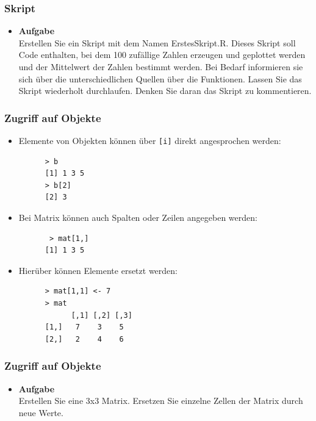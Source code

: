 \documentclass{beamer}
\begin{document}
\begin{frame}[fragile]
  \frametitle{Skript}
  \begin{itemize}
    \item \textbf{Aufgabe} \\ 
      Erstellen Sie ein Skript mit dem Namen ErstesSkript.R. Dieses Skript soll Code enthalten, bei dem 100 zufällige Zahlen erzeugen und geplottet werden und der Mittelwert der Zahlen bestimmt werden. Bei Bedarf informieren sie sich über die unterschiedlichen Quellen über die Funktionen. Lassen Sie das Skript wiederholt durchlaufen. Denken Sie daran das Skript zu kommentieren.
  \end{itemize}
\end{frame}

\begin{frame}[fragile]
  \frametitle{Zugriff auf Objekte}
  \begin{itemize}
    \item Elemente von Objekten können über \Verb+[i]+ direkt angesprochen werden:
    \begin{Verbatim}
      > b
      [1] 1 3 5
      > b[2]
      [2] 3
    \end{Verbatim}  
    \item Bei Matrix können auch Spalten oder Zeilen angegeben werden:
    \begin{Verbatim}
       > mat[1,]
      [1] 1 3 5
    \end{Verbatim}  
    \item Hierüber können Elemente ersetzt werden:
    \begin{Verbatim}
      > mat[1,1] <- 7
      > mat
            [,1] [,2] [,3]
      [1,]   7    3    5
      [2,]   2    4    6
    \end{Verbatim}        
  \end{itemize}
\end{frame}

\begin{frame}[fragile]
  \frametitle{Zugriff auf Objekte}
  \begin{itemize}
    \item \textbf{Aufgabe} \\ 
      Erstellen Sie eine 3x3 Matrix. Ersetzen Sie einzelne Zellen der Matrix durch neue Werte.
  \end{itemize}
\end{frame}
\end{document}
